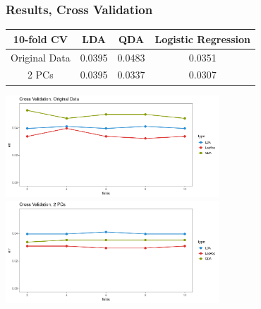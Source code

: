 \documentclass[10pt]{beamer}
\begin{document}
\begin{frame}\frametitle{Results, Cross Validation}
  \begin{center}
  \begin{tabular}{cccc}
    \toprule
    10-fold CV & LDA & QDA & Logistic Regression \\
    \midrule
    Original Data & 0.0395 & 0.0483 & 0.0351 \\
    2 PCs & 0.0395 & 0.0337 & 0.0307 \\
    \bottomrule
  \end{tabular}
\includegraphics[width=0.6\textwidth]{../images/cv-nopc.png} \\
\includegraphics[width=0.6\textwidth]{../images/cv-pc.png}
  \end{center}
\end{frame}
\end{document}
